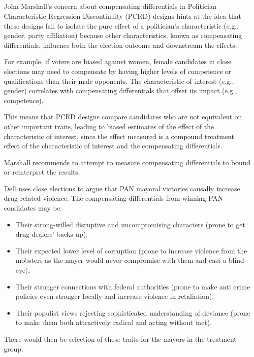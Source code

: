 \documentclass{article}
\begin{document}

\subsection{}

John Marshall's concern about compensating differentials in Politician Characteristic Regression Discontinuity (PCRD) designs hints at the idea that these designs fail to isolate the pure effect of a politician's characteristic (e.g., gender, party affiliation) because other characteristics, known as compensating differentials, influence both the election outcome and downstream the effects.

For example, if voters are biased against women, female candidates in close elections may need to compensate by having higher levels of competence or qualifications than their male opponents. The characteristic of interest (e.g., gender) correlates with compensating differentials that offset its impact (e.g., competence).

This means that PCRD designs compare candidates who are not equivalent on other important traits, leading to biased estimates of the effect of the characteristic of interest, since the effect measured is a compound treatment effect of the characteristic of interest and the compensating differentials.

Marshall recommends to attempt to measure compensating differentials to bound or reinterpret the results.

Dell uses close elections to argue that PAN mayoral victories causally increase drug-related violence. The compensating differentials from winning PAN condidates may be:
\begin{itemize}
    \item Their strong-willed disruptive and uncompromising characters (prone to get drug dealers' backs up),
    \item Their expected lower level of corruption (prone to increase violence from the mobsters as the mayer would never compromise with them and cast a blind eye),
    \item Their stronger connections with federal authorities (prone to make anti crime policies even stronger locally and increase violence in retaliation),
    \item Their populist views rejecting sophisticated understanding of deviance (prone to make them both attractively radical and acting without tact).
\end{itemize} 
There would then be selection of these traits for the mayors in the treatment group.
\end{document}
